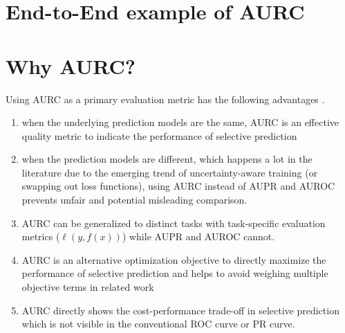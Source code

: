 


\section{End-to-End example of AURC}




\section*{Why AURC?}

Using AURC as a primary evaluation metric has the following advantages \cite{ding2020revisiting}.
\begin{enumerate}
    \item when the underlying prediction models are the same, AURC is an effective quality metric to indicate the performance of selective prediction
    \item  when the prediction models are different, which happens a lot in the literature due to the emerging trend of uncertainty-aware training (or swapping out loss functions), using AURC instead of AUPR and AUROC prevents unfair and potential misleading comparison.
    \item AURC can be generalized to distinct tasks with task-specific evaluation metrics ($\ell(y,f(x))$) while AUPR and AUROC cannot.
    \item AURC is an alternative optimization objective to directly maximize the performance of selective prediction and helps to avoid weighing multiple objective terms in related work
    \item AURC directly shows the cost-performance trade-off in selective prediction which is not visible in the conventional ROC curve or PR curve.
\end{enumerate}



